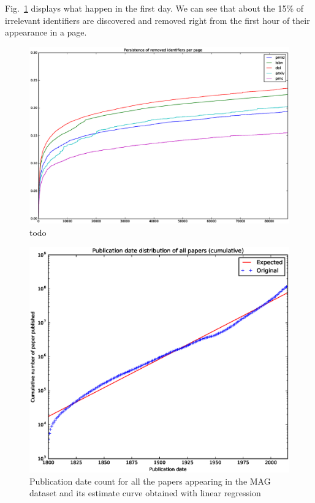 Fig.~\ref{fig:persistence_removed_identifiers_cdf_first_day} displays what happen in the first day.
We can see that about the 15\% of irrelevant identifiers are discovered and removed right from the first hour of their appearance in a page.

\begin{figure}[h]
\centering
\includegraphics[keepaspectratio=true, width=\textwidth]{assets/persistence_removed_identifiers_cdf_first_day}
\caption{todo}
\label{fig:persistence_removed_identifiers_cdf_first_day}
\end{figure}




\begin{figure}[h]
\centering
\includegraphics[keepaspectratio=true, width=\textwidth]{assets/publication_date_regression}
\caption{Publication date count for all the papers appearing in the \ac{MAG} dataset and its estimate curve obtained with linear regression}
\label{fig:publication_date_regression}
\end{figure}



